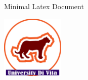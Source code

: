 \documentclass[12pt]{article}
\begin{document}
		\begin{center}
			{\Huge Minimal Latex Document} 
			\par
			\vspace{2cm}
			\includegraphics[height=3cm]{logo2}
			\vfill
		\end{center}
	\lipsum[1]
\end{document}
